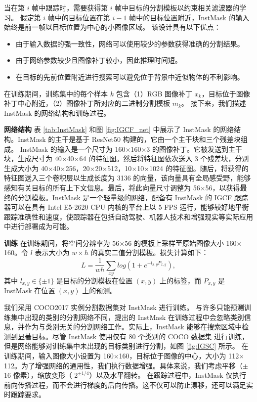 当在第 $i$ 帧中跟踪时，需要获得第 $i$ 帧中目标的分割模板以约束相关滤波器的学习。
假定第 $i$ 帧中的目标位置在第 $i-1$ 帧中的目标位置附近，InstMask 的输入始终是前一帧以目标位置为中心的小图像区域。
该设计具有以下优点：

\begin{itemize}
\item 由于输入数据的强一致性，网络可以使用较少的参数获得准确的分割结果。
\item 由于网络参数较少且图像补丁较小，因此推理时间短。
\item 在目标的先前位置附近进行搜索可以避免位于背景中近似物体的不利影响。
\end{itemize}

在训练期间，训练集中的每个样本 $k$ 包含（1）RGB 图像补丁 $x_k$，目标位于图像补丁中心附近，（2）图像补丁所对应的二进制分割模板 $m_{k}$。
接下来，我们描述 InstMask 的网络结构和训练过程。

\textbf{网络结构} 表 \ref{tab:InstMask} 和图 \ref{fig:IGCF_net} 中展示了 InstMask 的网络结构。InstMask 的主干是基于 ResNet50 \cite{he2016deep} 构建的，它由一个主干块和三个残差块组成。
InstMask 的输入是一个尺寸为 160$\times$160$\times$3 的图像补丁。它被发送到主干块，生成尺寸为 40$\times$40$\times$64 的特征图。然后将特征图依次送入 3 个残差块，分别生成大小为 40$\times$40$\times$256，20$\times$20$\times$512，10$\times$10$\times$1024 的特征图。随后，将获得的特征图送入三个卷积层以生成长度为 3136 的向量，该向量具有全局感受野，能够感知有关目标的所有上下文信息。最后，将此向量尺寸调整为 56$\times$56，以获得最终的分割模板。InstMask 是一个轻量级的网络，配备有 InstMask 的 IGCF 跟踪器可以在具有 Intel E5-2620 CPU 内核的平台上以 5 FPS 运行，能够较好地平衡跟踪准确性和速度，使跟踪器在包括自动驾驶、机器人技术和增强现实等实际应用中进行部署成为可能。

\textbf{训练} 在训练期间，将空间分辨率为 56$\times$56 的模板上采样至原始图像大小 160$\times$160。令 $l$ 表示大小为 $w \times h$ 的真实二值分割模板。损失计算如下：
\begin{equation}
L = \frac{1}{wh} \sum_{xy}{log(1+e^{-l_{x,y}P_{x,y}})},
\end{equation}
其中 $l_{x,y} \in \{ \pm 1 \}$ 是目标的分割模板在位置 $(x,y)$ 上的标签，而 $P_{x,y}$ 是 InstMask 在位置 $(x,y)$ 上的预测。

我们采用 COCO2017 \cite{COCO} 实例分割数据集对 InstMask 进行训练。
与许多只能预测训练集中出现的类别的分割网络不同，提出的 InstMask 在训练过程中会忽略类别信息，并作为与类别无关的分割网络工作。实际上，InstMask 能够在搜索区域中检测到显著目标。尽管 InstMask 使用仅有 80 个类别的 COCO 数据集 \cite{COCO} 进行训练，但是网络能够对训练集中未出现的目标类别进行分割，如图 \ref{fig:IGSC} 所示。
在训练期间，输入图像大小设置为 160$\times$160，目标位于图像的中心，大小为 112$\times$112。为了增强网络的通用性，我们执行数据增强。具体来说，我们考虑平移（$\pm$16 像素），缩放变形（ $2^{\pm 1/4}$）以及水平翻转。
在跟踪过程中，InstMask 仅执行前向传播过程，而不会进行梯度的后向传播。这不仅可以防止漂移，还可以满足实时跟踪要求。

